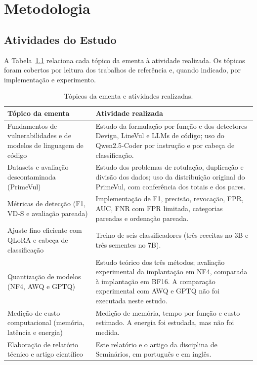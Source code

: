 \chapter{Metodologia}

\section{Atividades do Estudo}

A Tabela~\ref{tab:ementa} relaciona cada tópico da ementa à atividade realizada. Os tópicos foram cobertos por leitura dos trabalhos de referência e, quando indicado, por implementação e experimento.

\begin{table}[H]
    \centering
    \caption{Tópicos da ementa e atividades realizadas.}
    \label{tab:ementa}
    \footnotesize
    \begin{tabular}{|p{4.6cm}|p{9.4cm}|}
        \hline
        \textbf{Tópico da ementa} & \textbf{Atividade realizada} \\
        \hline
        Fundamentos de vulnerabilidades e de modelos de linguagem de código & Estudo da formulação por função e dos detectores Devign, LineVul e LLMs de código; uso do Qwen2.5-Coder por instrução e por cabeça de classificação. \\
        \hline
        Datasets e avaliação descontaminada (PrimeVul) & Estudo dos problemas de rotulação, duplicação e divisão dos dados; uso da distribuição original do PrimeVul, com conferência dos totais e dos pares. \\
        \hline
        Métricas de detecção (F1, VD-S e avaliação pareada) & Implementação de F1, precisão, revocação, FPR, AUC, FNR com FPR limitada, categorias pareadas e ordenação pareada. \\
        \hline
        Ajuste fino eficiente com QLoRA e cabeça de classificação & Treino de seis classificadores (três receitas no 3B e três sementes no 7B). \\
        \hline
        Quantização de modelos (NF4, AWQ e GPTQ) & Estudo teórico dos três métodos; avaliação experimental da implantação em NF4, comparada à implantação em BF16. A comparação experimental com AWQ e GPTQ não foi executada neste estudo. \\
        \hline
        Medição de custo computacional (memória, latência e energia) & Medição de memória, tempo por função e custo estimado. A energia foi estudada, mas não foi medida. \\
        \hline
        Elaboração de relatório técnico e artigo científico & Este relatório e o artigo da disciplina de Seminários, em português e em inglês. \\
        \hline
    \end{tabular}
\end{table}

